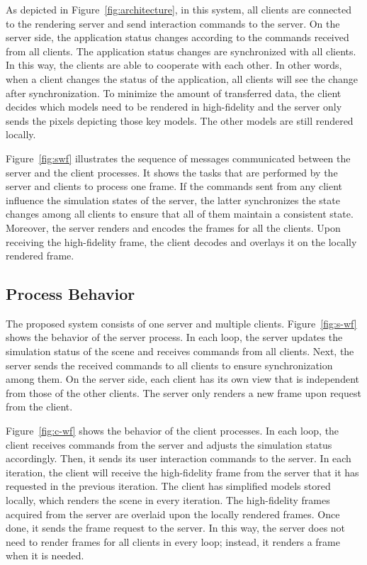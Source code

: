 As depicted in Figure~\ref{fig:architecture}, in this system, all clients are connected to the rendering server and send interaction commands to the server.
On the server side, the application status changes according to the commands received from all clients. The application status changes are synchronized with all clients. In this way, the clients are able to cooperate with each other. In other words, when a client changes the status of the application, all clients will see the change after synchronization.
To minimize the amount of transferred data, the client decides which models need to be rendered in high-fidelity and the server only sends the pixels depicting those key models. The other models are still rendered locally.

Figure~\ref{fig:swf} illustrates the sequence of messages communicated between the server and the client processes. It shows the tasks that are performed by the server and clients to process one frame. If the commands sent from any client influence the simulation states of the server, the latter synchronizes the state changes among all clients to ensure that all of them maintain a consistent state. Moreover, the server renders and encodes the frames for all the clients. Upon receiving the high-fidelity frame, the client decodes and overlays it on the locally rendered frame.

\subsection{Process Behavior}
\label{sec:hrr:m:pb}

The proposed system consists of one server and multiple clients.
Figure~\ref{fig:s-wf} shows the behavior of the server process.
In each loop, the server updates the simulation status of the scene and receives commands from all clients.
Next, the server sends the received commands to all clients to ensure synchronization among them.
On the server side, each client has its own view that is independent from those of the other clients.
The server only renders a new frame upon request from the client.

Figure~\ref{fig:c-wf} shows the behavior of the client processes. In each loop, the client receives commands from the server and adjusts the simulation status accordingly. Then, it sends its user interaction commands to the server. In each iteration, the client will receive the high-fidelity frame from the server that it has requested in the previous iteration. The client has simplified models stored locally, which renders the scene in every iteration. The high-fidelity frames acquired from the server are overlaid upon the locally rendered frames. Once done, it sends the frame request to the server. In this way, the server does not need to render frames for all clients in every loop; instead, it renders a frame when it is needed.

